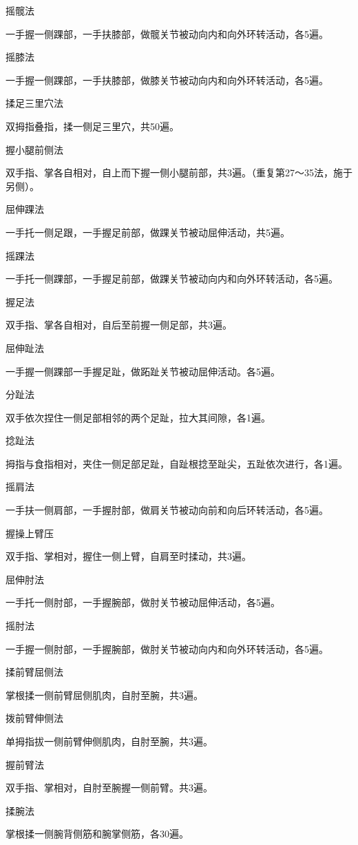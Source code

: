 \documentclass[12pt,UTF8,openany]{ctexbook}
\begin{document}
摇髋法

一手握一侧踝部，一手扶膝部，做髋关节被动向内和向外环转活动，各5遍。

摇膝法

一手握一侧踝部，一手扶膝部，做膝关节被动向内和向外环转活动，各5遍。

揉足三里穴法

双拇指叠指，揉一侧足三里穴，共50遍。

握小腿前侧法

双手指、掌各自相对，自上而下握一侧小腿前部，共3遍。（重复第27～35法，施于另侧）。

屈伸踝法

一手托一侧足跟，一手握足前部，做踝关节被动屈伸活动，共5遍。

摇踝法

一手托一侧踝部，一手握足前部，做踝关节被动向内和向外环转活动，各5遍。

握足法

双手指、掌各自相对，自后至前握一侧足部，共3遍。

屈伸趾法

一手握一侧踝部一手握足趾，做跖趾关节被动屈伸活动。各5遍。

分趾法

双手依次捏住一侧足部相邻的两个足趾，拉大其间隙，各1遍。

捻趾法

拇指与食指相对，夹住一侧足部足趾，自趾根捻至趾尖，五趾依次进行，各1遍。

摇肩法

一手扶一侧肩部，一手握肘部，做肩关节被动向前和向后环转活动，各5遍。

握操上臂压

双手指、掌相对，握住一侧上臂，自肩至时揉动，共3遍。

屈伸肘法

一手托一侧肘部，一手握腕部，做肘关节被动屈伸活动，各5遍。

摇肘法

一手握一侧肘部，一手握腕部，做肘关节被动向内和向外环转活动，各5遍。

揉前臂屈侧法

掌根揉一侧前臂屈侧肌肉，自肘至腕，共3遍。

拨前臂伸侧法

单拇指拔一侧前臂伸侧肌肉，自肘至腕，共3遍。

握前臂法

双手指、掌相对，自肘至腕握一侧前臂。共3遍。

揉腕法

掌根揉一侧腕背侧筋和腕掌侧筋，各30遍。
\end{document}
